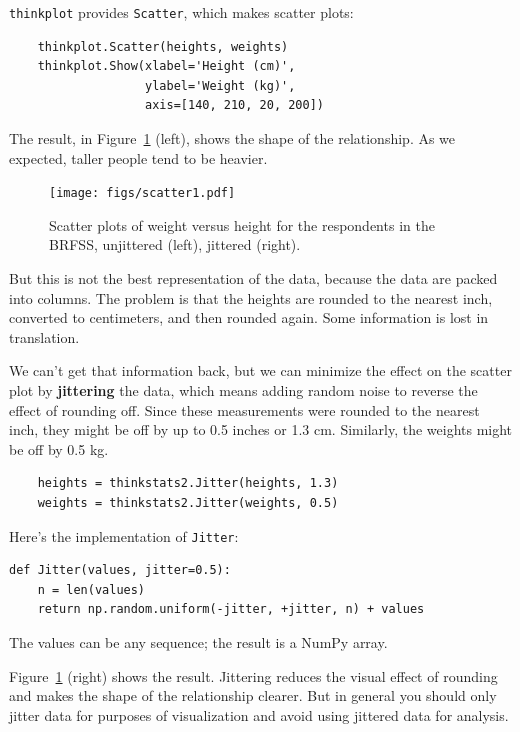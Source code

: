\documentclass[12pt]{book}
\theoremstyle{exercise}
\begin{document}
{\tt thinkplot} provides {\tt Scatter}, which makes scatter plots:
%
\begin{verbatim}
    thinkplot.Scatter(heights, weights)
    thinkplot.Show(xlabel='Height (cm)',
                   ylabel='Weight (kg)',
                   axis=[140, 210, 20, 200])
\end{verbatim}

The result, in Figure~\ref{scatter1} (left), shows the shape of
the relationship.  As we expected, taller
people tend to be heavier.  

\begin{figure}
\centerline{\texttt{[image: figs/scatter1.pdf]}}
\caption{Scatter plots of weight versus height for the respondents
in the BRFSS, unjittered (left), jittered (right).}%
\label{scatter1}
\end{figure}

But this is not the best representation of
the data, because the data are packed into columns.  The problem is
that the heights are rounded to the nearest inch, converted to
centimeters, and then rounded again.  Some information is lost in
translation.%
%
%

We can't get that information back, but we can minimize the effect on
the scatter plot by {\bf jittering} the data, which means adding random
noise to reverse the effect of rounding off.  Since these measurements
were rounded to the nearest inch, they might be off by up to 0.5 inches or
1.3 cm.  Similarly, the weights might be off by 0.5 kg.%
%
%

%
\begin{verbatim}
    heights = thinkstats2.Jitter(heights, 1.3)
    weights = thinkstats2.Jitter(weights, 0.5)
\end{verbatim}

Here's the implementation of {\tt Jitter}:

\begin{verbatim}
def Jitter(values, jitter=0.5):
    n = len(values)
    return np.random.uniform(-jitter, +jitter, n) + values
\end{verbatim}

The values can be any sequence; the result is a NumPy array.%

Figure~\ref{scatter1} (right) shows the result.  Jittering reduces the
visual effect of rounding and makes the shape of the relationship
clearer.  But in general you should only jitter data for purposes of
visualization and avoid using jittered data for analysis.
\end{document}

